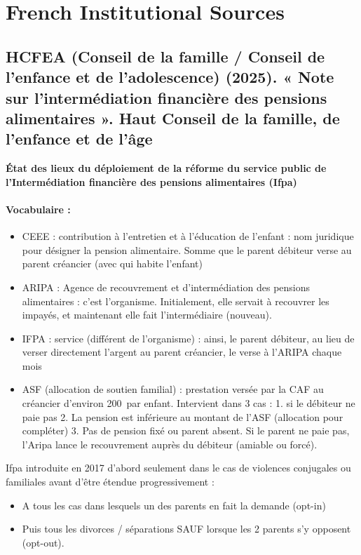 \documentclass{article}
\begin{document}
\section{French Institutional Sources}
\subsection*{HCFEA (Conseil de la famille / Conseil de l'enfance et de l'adolescence) (2025). « Note sur l'intermédiation financière des pensions alimentaires ». Haut Conseil de la famille, de l'enfance et de l'âge}
 
\textbf{État des lieux du déploiement de la réforme du service public de l'Intermédiation financière des pensions alimentaires (Ifpa)}
 
\paragraph{Vocabulaire :}
\begin{itemize}
    \item CEEE : contribution à l'entretien et à l'éducation de l'enfant : nom juridique pour désigner la pension alimentaire. Somme que le parent débiteur verse au parent créancier (avec qui habite l'enfant)
    \item ARIPA : Agence de recouvrement et d'intermédiation des pensions alimentaires : c'est l'organisme. Initialement, elle servait à recouvrer les impayés, et maintenant elle fait l'intermédiaire (nouveau).
    \item IFPA : service (différent de l'organisme) : ainsi, le parent débiteur, au lieu de verser directement l'argent au parent créancier, le verse à l'ARIPA chaque mois
    \item ASF (allocation de soutien familial) : prestation versée par la CAF au créancier d'environ 200\,\texteuro{} par enfant. Intervient dans 3 cas : 1. si le débiteur ne paie pas 2. La pension est inférieure au montant de l'ASF (allocation pour compléter) 3. Pas de pension fixé ou parent absent. Si le parent ne paie pas, l'Aripa lance le recouvrement auprès du débiteur (amiable ou forcé).
\end{itemize}
 
\medskip
\noindent Ifpa introduite en 2017 d'abord seulement dans le cas de violences conjugales ou familiales avant d'être étendue progressivement :
\begin{itemize}
    \item A tous les cas dans lesquels un des parents en fait la demande (opt-in)
    \item Puis tous les divorces / séparations SAUF lorsque les 2 parents s'y opposent (opt-out).
\end{itemize}
 
\end{document}
